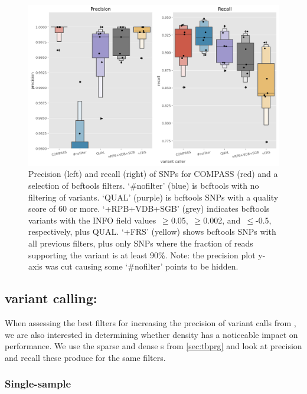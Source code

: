 \begin{figure}
\begin{center}
\includegraphics[width=0.90\columnwidth]{Chapter2/Figs/bcftools-precision-recall-filters.png}
\caption{{Precision (left) and recall (right) of SNPs for COMPASS (red) and a
selection of bcftools filters. `\#nofilter' (blue) is bcftools with no
filtering of variants. `QUAL' (purple) is bcftools SNPs with a quality score of
60 or more. `+RPB+VDB+SGB' (grey) indicates bcftools variants with the INFO
field values~\(\ge\)0.05,~\(\ge\)0.002,
and~\(\le\)-0.5, respectively, plus QUAL. `+FRS' (yellow) shows
bcftools SNPs with all previous filters, plus only SNPs where the
fraction of reads supporting the variant is at least 90\%. Note: the
precision plot y-axis was cut causing some `\#nofilter' points to be
hidden.
{\label{fig:bcftools-filters}}%
}}
\end{center}
\end{figure}

\subsection{\ont{} variant calling: \pandora{}}
\label{sec:pandora-filters}

When assessing the best filters for increasing the precision of variant calls from \pandora{}, we are also interested in determining whether \prg{} density has a noticeable impact on performance. We use the sparse and dense \prg{}s from \autoref{sec:tbprg} and look at precision and recall these produce for the same filters.

\subsubsection{Single-sample}
\label{sec:map-var-calls}

